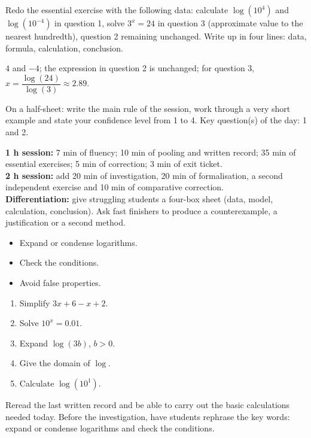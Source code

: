 
\begin{homework}Redo the essential exercise with the following data: calculate $\log(10^{4})$ and $\log(10^{-4})$ in question 1, solve $3^x=24$ in question 3 (approximate value to the nearest hundredth), question 2 remaining unchanged. Write up in four lines: data, formula, calculation, conclusion.\end{homework}
\begin{solution}$4$ and $-4$; the expression in question 2 is unchanged; for question 3, $x=\dfrac{\log(24)}{\log(3)}\approx\num{2,89}$.\end{solution}

\begin{exitticket}[3 minutes]On a half-sheet: write the main rule of the session, work through a very short example and state your confidence level from 1 to 4. Key question(s) of the day: 1 and 2.\end{exitticket}

\ifmxteacher
\begin{method}
\textbf{1 h session:} 7 min of fluency; 10 min of pooling and written record; 35 min of essential exercises; 5 min of correction; 3 min of exit ticket.\\
\textbf{2 h session:} add 20 min of investigation, 20 min of formalisation, a second independent exercise and 10 min of comparative correction.\\
\textbf{Differentiation:} give struggling students a four-box sheet (data, model, calculation, conclusion). Ask fast finishers to produce a counterexample, a justification or a second method.
\end{method}
\fi
{}
\begin{objectives}\begin{itemize}\item Expand or condense logarithms.\item Check the conditions.\item Avoid false properties.\end{itemize}\end{objectives}
\begin{fluency}\begin{enumerate}\item Simplify $3x+6-x+2$. \item Solve $10^x=\num{0,01}$. \item Expand $\log(3b)$, $b>0$. \item Give the domain of $\log$. \mxblank{$]0,+\infty[$}\item Calculate $\log(10^1)$. \end{enumerate}\end{fluency}
\begin{prerequisites}Reread the last written record and be able to carry out the basic calculations needed today. Before the investigation, have students rephrase the key words: expand or condense logarithms and check the conditions.\end{prerequisites}

